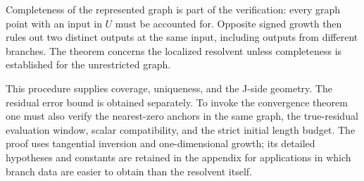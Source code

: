 Completeness of the represented graph is part of the verification: every
graph point with an input in \(U\) must be accounted for.  Opposite signed
growth then rules out two distinct outputs at the same input, including
outputs from different branches.  The theorem concerns the localized
resolvent unless completeness is established for the unrestricted graph.

This procedure supplies coverage, uniqueness, and the J-side geometry.
The residual error bound is obtained separately.  To invoke the convergence
theorem one must also verify the nearest-zero anchors in the same graph,
the true-residual evaluation window, scalar compatibility, and the strict
initial length budget.  The proof uses tangential
inversion and one-dimensional growth; its detailed hypotheses and constants
are retained in the appendix for applications in which branch data are
easier to obtain than the resolvent itself.
